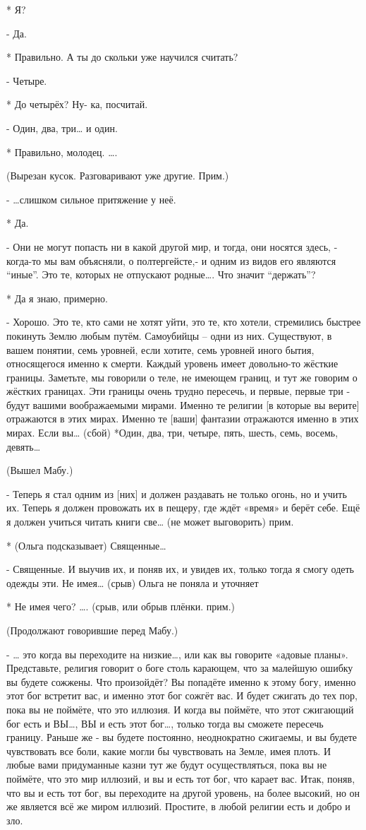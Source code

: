 *  Я?

- Да.

* Правильно. А ты до скольки уже научился считать?

- Четыре.

* До четырёх? Ну- ка, посчитай.

- Один, два, три… и один.

* Правильно, молодец. ….

(Вырезан кусок. Разговаривают уже другие. Прим.)

- …слишком сильное притяжение у неё.

* Да.

- Они не могут попасть ни в какой  другой мир, и тогда, они носятся здесь, - когда-то мы вам объясняли, о полтергейсте,- и одним из видов его являются “иные”. Это те, которых не отпускают родные…. Что значит “держать”?

* Да я знаю, примерно.

- Хорошо.  Это те, кто сами не хотят уйти, это те, кто хотели, стремились быстрее покинуть Землю любым путём. Самоубийцы – одни из них. Существуют, в вашем понятии, семь уровней, если хотите, семь уровней иного бытия, относящегося именно к смерти. Каждый уровень имеет довольно-то жёсткие границы. Заметьте, мы говорили о теле, не имеющем границ, и тут же говорим о жёстких границах. Эти границы очень трудно пересечь, и первые, первые три - будут вашими воображаемыми мирами. Именно те религии [в которые вы верите] отражаются в этих мирах. Именно те [ваши] фантазии отражаются именно в этих мирах. Если вы…
(сбой)
*Один, два, три, четыре, пять, шесть, семь, восемь, девять…

(Вышел Мабу.)

- Теперь я стал одним из [них] и должен раздавать не только огонь, но и учить их. Теперь я должен провожать их в пещеру, где ждёт «время»  и берёт себе. Ещё я должен учиться читать книги све… (не может выговорить) прим.

* (Ольга подсказывает) Священные…

- Священные. И выучив их, и поняв их, и увидев их, только тогда я смогу одеть одежды эти. Не имея…
 (срыв) Ольга не поняла и уточняет

* Не имея чего? …. (срыв, или обрыв плёнки. прим.)

(Продолжают говорившие перед Мабу.)

- … это когда вы переходите на низкие…, или как вы говорите «адовые планы». Представьте, религия говорит о боге столь карающем, что за малейшую ошибку вы будете сожжены. Что произойдёт? Вы попадёте именно к этому богу, именно этот бог встретит вас, и именно этот бог сожгёт вас. И будет сжигать до тех пор, пока вы не поймёте, что это иллюзия. И когда вы поймёте, что этот сжигающий бог есть и ВЫ…, ВЫ и есть этот бог…, только тогда вы сможете пересечь границу. Раньше же - вы будете постоянно, неоднократно сжигаемы, и вы будете чувствовать все боли, какие могли бы чувствовать на Земле, имея плоть. И любые вами придуманные казни тут же будут осуществляться, пока вы не поймёте, что это мир иллюзий, и вы и есть тот бог, что карает вас. Итак, поняв, что вы и есть тот бог, вы переходите на другой уровень, на более высокий, но он же является всё же миром иллюзий.  Простите, в любой религии есть и добро и зло.

